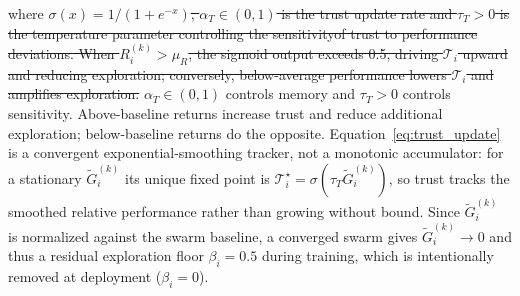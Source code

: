 \documentclass[lettersize,journal]{IEEEtran}
\providecommand{\DIFadd}[1]{{\protect\color{blue}#1}} %
\providecommand{\DIFdel}[1]{{\protect\color{red}\sout{#1}}}                      %
\providecommand{\DIFaddbegin}{} %
\providecommand{\DIFaddend}{} %
\providecommand{\DIFdelbegin}{} %
\providecommand{\DIFdelend}{} %
\newcommand{\DIFscaledelfig}{0.5}
\newlength{\DIFdelgraphicswidth} %
\newlength{\DIFdelgraphicsheight} %
\newcommand{\DIFaddincludegraphics}[2][]{{\color{blue}\fbox{\DIFOincludegraphics[#1]{#2}}}} %
\newcommand{\DIFdelincludegraphics}[2][]{%
\sbox{\DIFdelgraphicsbox}{\DIFOincludegraphics[#1]{#2}}%
\settoboxwidth{\DIFdelgraphicswidth}{\DIFdelgraphicsbox} %
\settoboxtotalheight{\DIFdelgraphicsheight}{\DIFdelgraphicsbox} %
\scalebox{\DIFscaledelfig}{%
\parbox[b]{\DIFdelgraphicswidth}{\usebox{\DIFdelgraphicsbox}\\[-\baselineskip] \rule{\DIFdelgraphicswidth}{0em}}\llap{\resizebox{\DIFdelgraphicswidth}{\DIFdelgraphicsheight}{%
\setlength{\unitlength}{\DIFdelgraphicswidth}%
\begin{picture}(1,1)%
\thicklines\linethickness{2pt} %
{\color[rgb]{1,0,0}\put(0,0){\framebox(1,1){}}}%
{\color[rgb]{1,0,0}\put(0,0){\line( 1,1){1}}}%
{\color[rgb]{1,0,0}\put(0,1){\line(1,-1){1}}}%
\end{picture}%
}\hspace*{3pt}}} %
} %
\DeclareRobustCommand{\DIFaddbegin}{\DIFOaddbegin \let\includegraphics\DIFaddincludegraphics} %
\DeclareRobustCommand{\DIFaddend}{\DIFOaddend \let\includegraphics\DIFOincludegraphics} %
\DeclareRobustCommand{\DIFdelbegin}{\DIFOdelbegin \let\includegraphics\DIFdelincludegraphics} %
\DeclareRobustCommand{\DIFdelend}{\DIFOaddend \let\includegraphics\DIFOincludegraphics} %
\begin{document}
where \DIFdelbegin \DIFdel{$\sigma(x) = 1/(1+e^{-x})$, $\alpha_T \in (0,1)$ is the trust update rate and $\tau_T > 0$ is the temperature parameter controlling the sensitivityof trust to performance deviations. When $R_i^{(k)} > \mu_R$, the sigmoid output exceeds 0.5, driving $\mathcal{T}_i$ upward and reducing exploration; conversely, below-average performance lowers $\mathcal{T}_i$ and amplifies exploration.
}\DIFdelend \DIFaddbegin \DIFadd{$\alpha_T\in(0,1)$ controls memory and $\tau_T>0$ controls sensitivity. Above-baseline
returns increase trust and reduce additional exploration; below-baseline returns do the
opposite. Equation~\eqref{eq:trust_update} is a convergent exponential-smoothing tracker,
not a monotonic accumulator: for a stationary $\widetilde G_i^{(k)}$ its unique fixed point
is $\mathcal T_i^{\star}=\sigma(\tau_T\widetilde G_i^{(k)})$, so trust tracks the smoothed
relative performance rather than growing without bound. Since $\widetilde G_i^{(k)}$ is
normalized against the swarm baseline, a converged swarm gives $\widetilde G_i^{(k)}\!\to\!0$
and thus a residual exploration floor $\beta_i=0.5$ during training, which is intentionally
removed at deployment ($\beta_i=0$).
}\DIFaddend
\end{document}
